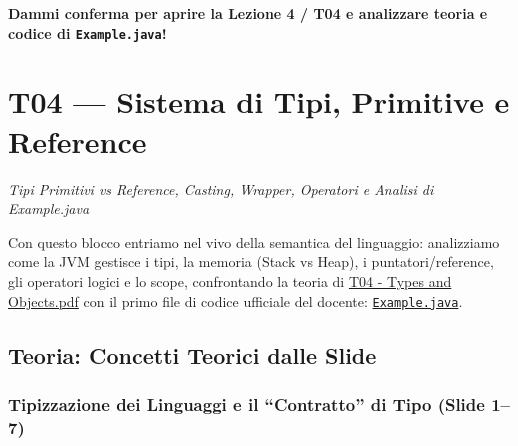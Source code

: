 \documentclass[11pt,a4paper,oneside]{report}
\newcommand{\passthrough}[1]{#1}
\begin{document}
\textbf{Dammi conferma per aprire la Lezione 4 / T04 e analizzare teoria
e codice di \passthrough{\lstinline!Example.java!}!}

\newpage
\chapter[T04 --- Sistema di Tipi, Primitive e Refere]{T04 --- Sistema di Tipi, Primitive e Reference}
\label{chap:t04}

{\small\sffamily\color{accentblue!80!black}\textit{Tipi Primitivi vs Reference, Casting, Wrapper, Operatori e Analisi di Example.java}}

\vspace{0.8em}

Con questo blocco entriamo nel vivo della semantica del linguaggio:
analizziamo come la JVM gestisce i tipi, la memoria (Stack vs Heap), i
puntatori/reference, gli operatori logici e lo scope, confrontando la
teoria di
\href{file:///home/wally/Documenti/GitHub/Programmazione-II/25-26/Teoria-e-Esercitazioni/Slides-20260902/T04\%20-\%20Types\%20and\%20Objects.pdf}{T04
- Types and Objects.pdf} con il primo file di codice ufficiale del
docente:
\href{file:///home/wally/Documenti/GitHub/Programmazione-II/25-26/Teoria-e-Esercitazioni/Codice-20260902/Lezione04/Example.java}{\passthrough{\lstinline!Example.java!}}.

\section{Teoria: Concetti Teorici dalle
Slide}\label{chap04_teoria-concetti-teorici-dalle-slide}

\subsection{Tipizzazione dei Linguaggi e il ``Contratto'' di Tipo (Slide
1--7)}\label{chap04_tipizzazione-dei-linguaggi-e-il-contratto-di-tipo-slide-17}
\end{document}
